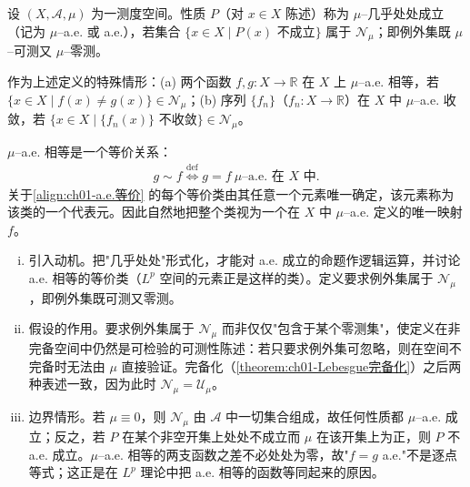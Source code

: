 \documentclass[../../main.tex]{subfiles}%
\begin{document}
\begin{definition}\label{definition:ch01-a.e.}
设 $(X,\mathcal{A},\mu)$ 为一测度空间。性质 $P$（对 $x\in X$ 陈述）称为 $\mu$--几乎处处成立（记为 $\mu$--a.e. 或 a.e.），若集合 $\{x\in X\mid P(x)\text{ 不成立}\}$ 属于 $\mathcal{N}_\mu$；即例外集既 $\mu$--可测又 $\mu$--零测。
\end{definition}

作为上述定义的特殊情形：(a) 两个函数 $f,g:X\to\mathbb{R}$ 在 $X$ 上 $\mu$--a.e. 相等，若 $\{x\in X\mid f(x)\neq g(x)\}\in\mathcal{N}_\mu$；(b) 序列 $\{f_n\}$（$f_n:X\to\mathbb{R}$）在 $X$ 中 $\mu$--a.e. 收敛，若 $\{x\in X\mid\{f_n(x)\}\text{ 不收敛}\}\in\mathcal{N}_\mu$。

$\mu$--a.e. 相等是一个等价关系：
\begin{align}
g\sim f\overset{\mathrm{def}}{\Longleftrightarrow} g=f\ \mu\text{--a.e. 在 }X\text{ 中}. \label{align:ch01-a.e.等价}
\end{align}
关于\eqref{align:ch01-a.e.等价} 的每个等价类由其任意一个元素唯一确定，该元素称为该类的一个代表元。因此自然地把整个类视为一个在 $X$ 中 $\mu$--a.e. 定义的唯一映射 $f$。

\begin{remark}\label{remark:ch01-a.e.动机}
\begin{enumerate}[(i)]
\item 引入动机。把"几乎处处"形式化，才能对 a.e. 成立的命题作逻辑运算，并讨论 a.e. 相等的等价类（$L^p$ 空间的元素正是这样的类）。定义要求例外集属于 $\mathcal{N}_\mu$，即例外集既可测又零测。
\item 假设的作用。要求例外集属于 $\mathcal{N}_\mu$ 而非仅仅"包含于某个零测集"，使定义在非完备空间中仍然是可检验的可测性陈述：若只要求例外集可忽略，则在空间不完备时无法由 $\mu$ 直接验证。完备化（\cref{theorem:ch01-Lebesgue完备化}）之后两种表述一致，因为此时 $\mathcal{N}_\mu=\mathcal{U}_\mu$。
\item 边界情形。若 $\mu\equiv0$，则 $\mathcal{N}_\mu$ 由 $\mathcal{A}$ 中一切集合组成，故任何性质都 $\mu$--a.e. 成立；反之，若 $P$ 在某个非空开集上处处不成立而 $\mu$ 在该开集上为正，则 $P$ 不 a.e. 成立。$\mu$--a.e. 相等的两支函数之差不必处处为零，故"$f=g$ a.e."不是逐点等式；这正是在 $L^p$ 理论中把 a.e. 相等的函数等同起来的原因。
\end{enumerate}
\end{remark}
\end{document}
